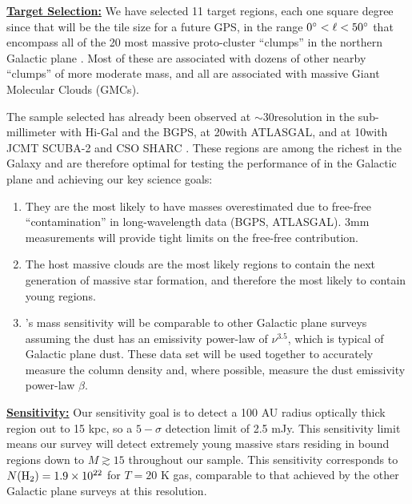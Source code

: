\indent\underline{\textbf{\helv Target Selection:}} We have selected 11 target regions,
each one square degree since that will be the tile size for a future GPS, in the range $0\mbox{$^\circ$} < \ell < 50\mbox{$^\circ$}$
that encompass all of the 20 most massive proto-cluster “clumps” in the
northern Galactic plane \citep{Ginsburg2012a}.  Most of these are associated
with dozens of other nearby “clumps” of more moderate mass, and all are
associated with massive Giant Molecular Clouds (GMCs).  

The sample selected has already been observed at $\sim$30\arcsec resolution in
the sub-millimeter with Hi-Gal and the BGPS, at 20\arcsec with ATLASGAL, and at
10\arcsec with JCMT SCUBA-2 and CSO SHARC \citep{Lin2016a}.  
These regions are among the richest in the Galaxy and are therefore optimal for testing the performance of \MUSTANG in the Galactic plane and achieving our key science goals:
\vspace{-2mm}
\begin{enumerate}
    \item {\helv They are the most likely to have masses overestimated due to free-free
“contamination” in long-wavelength data (BGPS, ATLASGAL). 
3mm measurements will provide tight limits on the free-free contribution.
}



    \item {\helv The host massive clouds are the most likely regions to contain the next
generation of massive star formation, and therefore the most likely to contain
young \hchii regions.  }

    \item {\helv \MUSTANG’s mass sensitivity will be comparable to other Galactic plane surveys assuming the
dust has an emissivity power-law of $\nu^{3.5}$, which is typical of Galactic plane
dust.  These data set will be used together to accurately measure the column density and, where possible, measure the dust emissivity power-law $\beta$.}
\end{enumerate}

\indent\underline{\textbf{\helv Sensitivity:}}  Our sensitivity goal is to
detect a 100 AU radius optically thick \hii region out to 15 kpc, so a
$5-\sigma$ detection limit of 2.5 mJy.  This sensitivity limit means our survey
will detect extremely young massive stars residing in bound \hii regions down
to $M \gtrsim 15$ \msun throughout our sample.  This sensitivity corresponds to
$N(\textrm{H}_{2})=1.9\times10^{22}$ \persc for $T=20$ K gas, comparable to that achieved by the
other Galactic plane surveys at this resolution.


